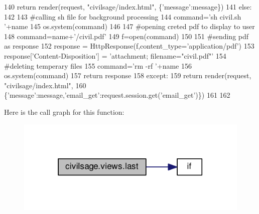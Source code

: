 \begin{DoxyCode}
140             \textcolor{keywordflow}{return} render(request, \textcolor{stringliteral}{"civilsage/index.html"}, \{\textcolor{stringliteral}{'message'}:message\})
141         \textcolor{keywordflow}{else}:
142 
143             \textcolor{comment}{#calling sh file for background processing}
144             command=\textcolor{stringliteral}{'sh  civil.sh '}+name
145             os.system(command)
146 
147             \textcolor{comment}{#opening creted pdf to display to user}
148             command=name+\textcolor{stringliteral}{'/civil.pdf'}
149             f=open(command)
150 
151             \textcolor{comment}{#sending pdf as response}
152             response = HttpResponse(f,content\_type=\textcolor{stringliteral}{'application/pdf'})
153             response[\textcolor{stringliteral}{'Content-Disposition'}] = \textcolor{stringliteral}{'attachment; filename="civil.pdf"'}
154             \textcolor{comment}{#deleting temperary files}
155             command=\textcolor{stringliteral}{'rm -rf '}+name
156             os.system(command)
157             \textcolor{keywordflow}{return} response
158     \textcolor{keywordflow}{except}:
159         \textcolor{keywordflow}{return} render(request, \textcolor{stringliteral}{"civilsage/index.html"},
160         \{\textcolor{stringliteral}{'message'}:message,\textcolor{stringliteral}{'email\_get'}:request.session.get(\textcolor{stringliteral}{'email\_get'})\})
161 
162 
\end{DoxyCode}


Here is the call graph for this function\+:\nopagebreak
\begin{figure}[H]
\begin{center}
\leavevmode
\includegraphics[width=322pt]{namespacecivilsage_1_1views_aed47fb0740a2fa14693f697905788719_cgraph}
\end{center}
\end{figure}


\hypertarget{namespacecivilsage_1_1views_a8b58c93a9c82e84143c43dafaa744a4b}{}
